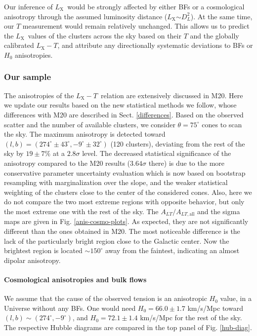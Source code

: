 \documentclass{aa}   %
\newcommand{\LT}{$L_{\text{X}}-T$}
\newcommand{\Lx}{$L_{\text{X}}$}
\begin{document}
Our inference of \Lx\ would be strongly affected by either BFs or a cosmological anisotropy through the assumed luminosity distance (\Lx$\sim D_L^2$). At the same time, our $T$ measurement would remain relatively unchanged. This allows us to predict the \Lx\ values of the clusters across the sky based on their $T$ and the globally calibrated \LT, and attribute any directionally systematic deviations to BFs or $H_0$ anisotropies.

\subsubsection{Our sample}

The anisotropies of the \LT\ relation are extensively discussed in M20. Here we update our results based on the new statistical methods we follow, whose differences with M20 are described in Sect. \ref{differences}. Based on the observed scatter and the number of available clusters, we consider $\theta=75^{\circ}$ cones to scan the sky. The maximum anisotropy is detected toward $(l,b)=(274^{\circ}\pm 43^{\circ},-9^{\circ}\pm 32^{\circ})$ (120 clusters), deviating from the rest of the sky by $19\pm 7\%$ at a $2.8\sigma$ level. The decreased statistical significance of the anisotropy compared to the M20 results ($3.64\sigma$ there) is due to the more conservative parameter uncertainty evaluation which is now based on bootstrap resampling with marginalization over the slope, and the weaker statistical weighting of the clusters close to the center of the considered cones. Also, here we do not compare the two most extreme regions with opposite behavior, but only the most extreme one with the rest of the sky. The $A_{LT}/A_{LT,\text{all}}$ and the sigma maps are given in Fig. \ref{anis-cosmo-plots}. As expected, they are not significantly different than the ones obtained in M20. The most noticeable difference is the lack of the particularly bright region close to the Galactic center. Now the brightest region is located $\sim 150^{\circ}$ away from the faintest, indicating an almost dipolar anisotropy.

\paragraph{Cosmological anisotropies and bulk flows}

We assume that the cause of the observed tension is an anisotropic $H_0$ value, in a Universe without any BFs. One would need $H_0=66.0\pm 1.7 $ km/s/Mpc toward $(l,b)\sim (274^{\circ},-9^{\circ})$, and $H_0=72.1\pm 1.4$ km/s/Mpc for the rest of the sky. The respective Hubble diagrams are compared in the top panel of Fig. \ref{hub-diag}.
\end{document}
